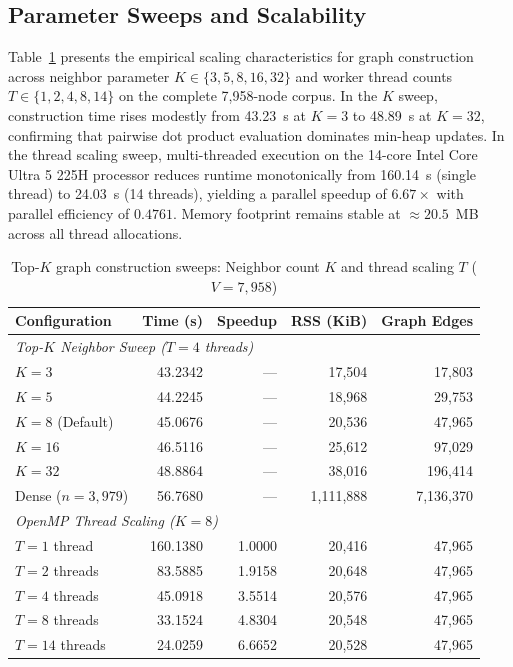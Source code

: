 \documentclass[conference]{IEEEtran}
\begin{document}
\subsection{Parameter Sweeps and Scalability}
Table~\ref{tab:k-threads} presents the empirical scaling characteristics for graph construction across neighbor parameter $K \in \{3, 5, 8, 16, 32\}$ and worker thread counts $T \in \{1, 2, 4, 8, 14\}$ on the complete 7,958-node corpus. In the $K$ sweep, construction time rises modestly from 43.23~s at $K=3$ to 48.89~s at $K=32$, confirming that pairwise dot product evaluation dominates min-heap updates. In the thread scaling sweep, multi-threaded execution on the 14-core Intel Core Ultra 5 225H processor reduces runtime monotonically from 160.14~s (single thread) to 24.03~s (14 threads), yielding a parallel speedup of $6.67\times$ with parallel efficiency of $0.4761$. Memory footprint remains stable at $\approx 20.5$~MB across all thread allocations.

\begin{table}[!t]
\caption{Top-$K$ graph construction sweeps: Neighbor count $K$ and thread scaling $T$ ($V=7,958$)}
\label{tab:k-threads}\centering\scriptsize
\setlength{\tabcolsep}{3pt}
\begin{tabularx}{\columnwidth}{l r r r r}\toprule
Configuration & Time (s) & Speedup & RSS (KiB) & Graph Edges \\ \midrule
\multicolumn{5}{l}{\textit{Top-$K$ Neighbor Sweep ($T=4$ threads)}} \\
$K = 3$ & 43.2342 & --- & 17,504 & 17,803 \\
$K = 5$ & 44.2245 & --- & 18,968 & 29,753 \\
$K = 8$ (Default) & 45.0676 & --- & 20,536 & 47,965 \\
$K = 16$ & 46.5116 & --- & 25,612 & 97,029 \\
$K = 32$ & 48.8864 & --- & 38,016 & 196,414 \\
Dense ($n=3,979$) & 56.7680 & --- & 1,111,888 & 7,136,370 \\ \midrule
\multicolumn{5}{l}{\textit{OpenMP Thread Scaling ($K=8$)}} \\
$T = 1$ thread & 160.1380 & 1.0000 & 20,416 & 47,965 \\
$T = 2$ threads & 83.5885 & 1.9158 & 20,648 & 47,965 \\
$T = 4$ threads & 45.0918 & 3.5514 & 20,576 & 47,965 \\
$T = 8$ threads & 33.1524 & 4.8304 & 20,548 & 47,965 \\
$T = 14$ threads & 24.0259 & 6.6652 & 20,528 & 47,965 \\
\bottomrule\end{tabularx}
\end{table}
\end{document}
